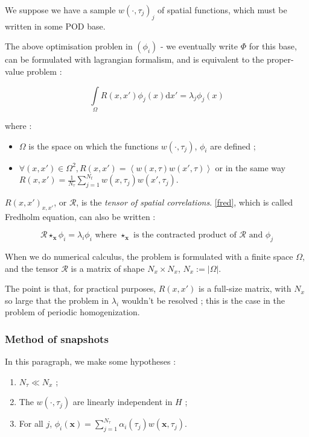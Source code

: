 We suppose we have a sample $w(\cdot,\tau_j)_j$ of spatial functions, which must be written in some POD base.

\par
The above optimisation problen in $(\phi_i)$ - we eventually write $\Phi$ for this base, %
can be formulated with lagrangian formalism, and is equivalent to the proper-value problem :

\begin{equation}\label{fred}
\int\limits_{\Omega}R(x,x')\phi_j (x)\text{d}x'=\lambda_j \phi_j (x)
\end{equation}

where :
\begin{itemize}
\item $\Omega$ is the space on which the functions $w(\cdot ,\tau_j)$, $\phi_i$ are defined ;
\item $\forall (x,x')\in\Omega^2 , R(x,x')=\left\langle w(x,\tau)w(x',\tau)\right\rangle$ or in the same way $R(x,x')=\frac{1}{N_{\tau}}\sum\limits_{j=1}^{N_t} w(x,\tau_j)w(x',\tau_j)$.
\end{itemize}

$R(x,x')_{x,x'}$, or $\mathcal{R}$, is the \emph{tensor of spatial correlations}. %
\ref{fred}, which is called Fredholm equation, can also be written :

\[\mathcal{R}\star_{\mathbf{x}}\phi_i=\lambda_i\phi_i\text{ where $\star_{\mathbf{x}}$ is the contracted product of $\mathcal{R}$ and $\phi_j$}\]

\etoile
When we do numerical calculus, the problem is formulated with a finite space $\Omega$, %
and the tensor $\mathcal{R}$ is a matrix of shape $N_x\times N_x$, $N_x :=|\Omega|$.

\par
The point is that, for practical purposes, $R(x,x')$ is a full-size matrix, with $N_x$ so large that the problem in $\lambda_i$ wouldn't be resolved ; %
this is the case in the problem of periodic homogenization.

\subsubsection{Method of snapshots}

In this paragraph, we make some hypotheses :

\begin{enumerate}[label=(Snap \arabic*)]
\item\label{hs1} $N_{\tau}\ll N_x$ ;
\item\label{hs2} The $w(\cdot , \tau_j)$ are linearly independent in $H$ ;
\item\label{hs3} For all $j$, $\phi_i(\mathbf{x})=\sum\limits_{j=1}^{N_{\tau}}\alpha_i(\tau_j) w(\mathbf{x},\tau_j)$.
\end{enumerate}

